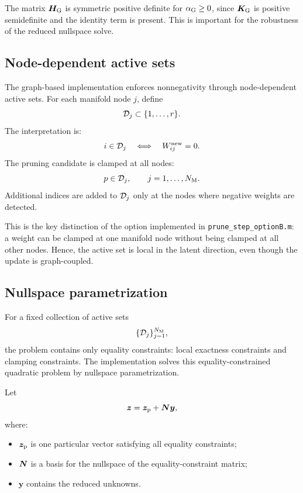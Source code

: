 \documentclass[11pt,a4paper]{article}
\begin{document}
The matrix $\bm H_{\mathrm{G}}$ is symmetric positive definite for $\alpha_{\mathrm{G}}\geq 0$, since
$\bm K_{\mathrm{G}}$ is positive semidefinite and the identity term is present. This is
important for the robustness of the reduced nullspace solve.

\subsection{Node-dependent active sets}

The graph-based implementation enforces nonnegativity through node-dependent
active sets. For each manifold node $j$, define
\[
        \mathcal{D}_j \subset \{1,\ldots,r\}.
\]
The interpretation is:
\[
        i\in\mathcal{D}_j
        \quad\Longleftrightarrow\quad
        W^{\mathrm{new}}_{ij}=0.
\]
The pruning candidate is clamped at all nodes:
\[
        p\in\mathcal{D}_j,
        \qquad
        j=1,\ldots,N_{\mathrm{M}}.
\]
Additional indices are added to $\mathcal{D}_j$ only at the nodes where negative weights
are detected.

This is the key distinction of the option implemented in
\texttt{prune\_step\_optionB.m}: a weight can be clamped at one manifold node
without being clamped at all other nodes. Hence, the active set is local in the
latent direction, even though the update is graph-coupled.

\subsection{Nullspace parametrization}

For a fixed collection of active sets
\[
        \{\mathcal{D}_j\}_{j=1}^{N_{\mathrm{M}}},
\]
the problem contains only equality constraints: local exactness constraints and
clamping constraints. The implementation solves this equality-constrained
quadratic problem by nullspace parametrization.

Let
\[
        \bm z = \bm z_{\mathrm{p}} + \bm N\bm y,
        \label{eq:nullspace_parametrization}
\]
where:
\begin{itemize}
    \item $\bm z_{\mathrm{p}}$ is one particular vector satisfying all equality constraints;
    \item $\bm N$ is a basis for the nullspace of the equality-constraint
    matrix;
    \item $\bm y$ contains the reduced unknowns.
\end{itemize}
\end{document}
